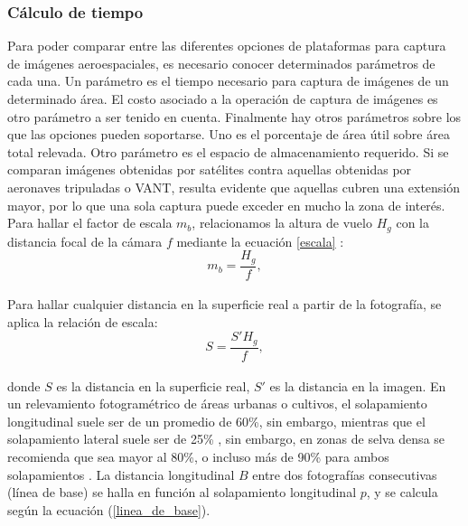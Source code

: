 \subsubsection{Cálculo de tiempo}
Para poder comparar entre las diferentes opciones de plataformas para captura de imágenes aeroespaciales, es necesario conocer determinados parámetros de cada una. Un parámetro es el tiempo necesario para captura de imágenes de un determinado área. El costo asociado a la operación de captura de imágenes es otro parámetro a ser tenido en cuenta. Finalmente hay otros parámetros sobre los que las opciones pueden soportarse. Uno es el porcentaje de área útil sobre área total relevada. Otro parámetro es el espacio de almacenamiento requerido.
Si se comparan imágenes obtenidas por satélites contra aquellas obtenidas por aeronaves tripuladas o VANT, resulta evidente que aquellas cubren una extensión mayor, por lo que una sola captura puede exceder en mucho la zona de interés. 
Para hallar el factor de escala $m_b$, relacionamos la altura de vuelo $H_g$ con la distancia focal
de la cámara $f$ mediante la ecuación \ref{escala} \cite{linder_digital_2016}:
\\
\begin{equation}
	m_b=\frac{H_g}{f},\label{escala}
\end{equation}
\\
Para hallar cualquier distancia en la superficie real a partir de la fotografía, se aplica la relación de escala:
\\
\begin{equation}
	S=\frac{S'H_g}{f},\label{escala1}
\end{equation}
\\
donde $S$ es la distancia en la superficie real, $S'$ es la distancia en la imagen.
En un relevamiento fotogramétrico de áreas urbanas o cultivos, el solapamiento longitudinal suele ser de un promedio de 60\%, sin embargo,  mientras que el solapamiento lateral suele ser de 25\% \cite{lopez_introduccion_nodate}, sin embargo, en zonas de selva densa se recomienda que sea mayor al 80\%, o incluso más de 90\% para ambos solapamientos \cite{dandois_optimal_2015, seifert_influence_2019}. La distancia longitudinal $B$ entre dos fotografías consecutivas (línea de base) se halla en función al solapamiento longitudinal $p$, y se calcula según la ecuación (\ref{linea_de_base}).
